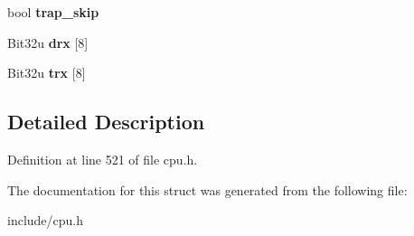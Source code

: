 \begin{DoxyCompactItemize}
\item 
\hypertarget{structCPUBlock_ad260beedb05a65ac8494b9d8f38010c2}{bool {\bfseries trap\-\_\-skip}}\label{structCPUBlock_ad260beedb05a65ac8494b9d8f38010c2}

\item 
\hypertarget{structCPUBlock_a58abd61bc639fbb9992d8715bb3ed6ac}{Bit32u {\bfseries drx} \mbox{[}8\mbox{]}}\label{structCPUBlock_a58abd61bc639fbb9992d8715bb3ed6ac}

\item 
\hypertarget{structCPUBlock_a8dacafb431cbcd0b7632b92f1999244a}{Bit32u {\bfseries trx} \mbox{[}8\mbox{]}}\label{structCPUBlock_a8dacafb431cbcd0b7632b92f1999244a}

\end{DoxyCompactItemize}


\subsection{Detailed Description}


Definition at line 521 of file cpu.\-h.



The documentation for this struct was generated from the following file\-:\begin{DoxyCompactItemize}
\item 
include/cpu.\-h\end{DoxyCompactItemize}
